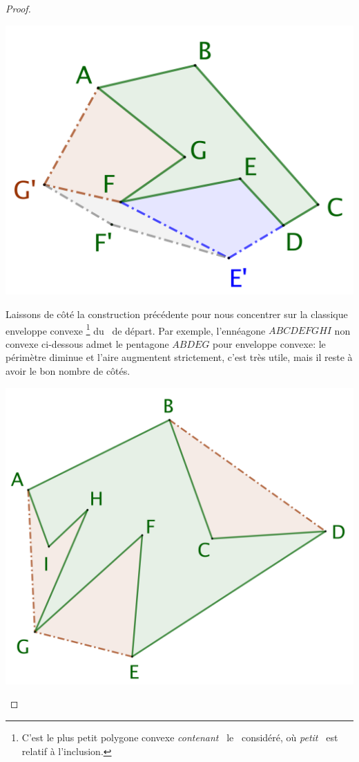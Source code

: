\begin{proof}
	\begin{center}
		\includegraphics[scale=.4]{content/polygon/necessary-cond/non-convex-bad.png}
	\end{center}


	Laissons de côté la construction précédente pour nous concentrer sur la classique enveloppe convexe%
	\footnote{
		C'est le plus petit polygone convexe \og \emph{contenant} \fg\ le \ngone\ considéré, où \og \emph{petit} \fg\ est relatif à l'inclusion.
	}
	du \ngone\ de départ.
	Par exemple, l'ennéagone $ABCDEFGHI$ non convexe ci-dessous admet le pentagone $ABDEG$ pour enveloppe convexe: le périmètre diminue et l'aire augmentent strictement, c'est très utile, mais il reste à avoir le bon nombre de côtés.

	\begin{center}
		\includegraphics[scale=.4]{content/polygon/necessary-cond/convex-hull.png}
	\end{center}


\end{proof}
